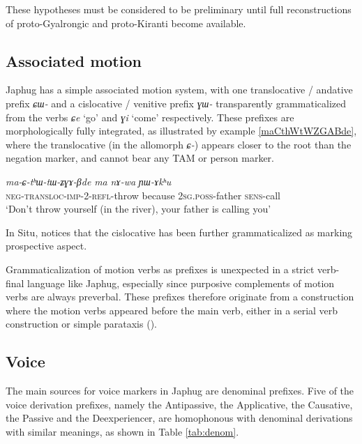 \documentclass[oneside,a4paper,11pt]{article}
\newcommand{\ipa}[1]{\mbox{\phon\textit{#1}}} %
\begin{document}
These hypotheses must be considered to be preliminary until full reconstructions of proto-Gyalrongic and proto-Kiranti become available.

\subsection{Associated motion} \label{sec:motion}
Japhug has a simple associated motion system, with one translocative / andative prefix \ipa{ɕɯ-} and a cislocative / venitive prefix \ipa{ɣɯ-} transparently grammaticalized from the verbs \ipa{ɕe} `go' and \ipa{ɣi} `come' respectively. These prefixes are morphologically fully integrated, as illustrated by example \ref{maCthWtWZGABde}, where the translocative (in the allomorph \ipa{ɕ-}) appears closer to the root than the negation marker, and cannot bear any TAM or person marker.  

\begin{exe}
\ex \label{maCthWtWZGABde}
\gll \ipa{ma-ɕ-tʰɯ-tɯ-ʑɣɤ-βde} 	\ipa{ma} 	\ipa{nɤ-wa} 	\ipa{ɲɯ-ɤkʰu}   \\
\textsc{neg-transloc-imp-2-refl}-throw because \textsc{2sg.poss}-father \textsc{sens}-call \\
\glt `Don't throw yourself (in the river), your father is calling you' 
\end{exe}

In Situ, \citet{youjing03zhuokeji} notices that the cislocative has been further grammaticalized as marking prospective aspect.

Grammaticalization of motion verbs as prefixes is unexpected in a strict verb-final language like Japhug, especially since purposive complements of motion verbs are always preverbal. These prefixes therefore originate from a construction where the motion verbs appeared before the main verb, either in a serial verb construction or simple parataxis (\citealt{jacques13harmonization}).

\subsection{Voice} \label{sec:voice}
The main sources for voice markers in Japhug are denominal prefixes. Five of the voice derivation prefixes, namely the Antipassive, the Applicative, the Causative, the Passive and the Deexperiencer, are homophonous with denominal derivations with similar meanings, as shown in Table \ref{tab:denom}.
\end{document}
